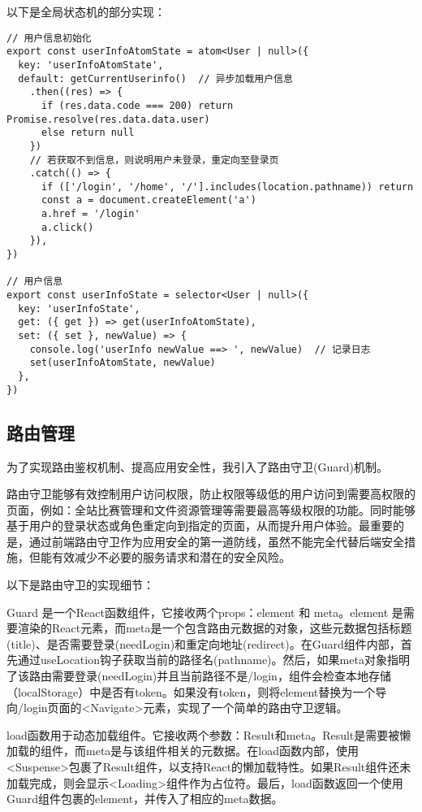 \documentclass[12pt,a4paper]{article}
\begin{document}
\begin{CJK*}{UTF8}{gbsn}
以下是全局状态机的部分实现：
\begin{mdframed}
\begin{verbatim}
// 用户信息初始化
export const userInfoAtomState = atom<User | null>({
  key: 'userInfoAtomState',
  default: getCurrentUserinfo()  // 异步加载用户信息
    .then((res) => {
      if (res.data.code === 200) return Promise.resolve(res.data.data.user)
      else return null
    })
    // 若获取不到信息，则说明用户未登录，重定向至登录页
    .catch(() => {
      if (['/login', '/home', '/'].includes(location.pathname)) return
      const a = document.createElement('a')
      a.href = '/login'
      a.click()
    }),
})

// 用户信息
export const userInfoState = selector<User | null>({
  key: 'userInfoState',
  get: ({ get }) => get(userInfoAtomState),
  set: ({ set }, newValue) => {
    console.log('userInfo newValue ==> ', newValue)  // 记录日志
    set(userInfoAtomState, newValue)
  },
})
\end{verbatim}
\end{mdframed}

\subsection{路由管理}
为了实现路由鉴权机制、提高应用安全性，我引入了路由守卫(Guard)机制。

路由守卫能够有效控制用户访问权限，防止权限等级低的用户访问到需要高权限的页面，例如：全站比赛管理和文件资源管理等需要最高等级权限的功能。同时能够基于用户的登录状态或角色重定向到指定的页面，从而提升用户体验。最重要的是，通过前端路由守卫作为应用安全的第一道防线，虽然不能完全代替后端安全措施，但能有效减少不必要的服务请求和潜在的安全风险。

以下是路由守卫的实现细节：

Guard 是一个React函数组件，它接收两个props：element 和 meta。element 是需要渲染的React元素，而meta是一个包含路由元数据的对象，这些元数据包括标题(title)、是否需要登录(needLogin)和重定向地址(redirect)。在Guard组件内部，首先通过useLocation钩子获取当前的路径名(pathname)。然后，如果meta对象指明了该路由需要登录(needLogin)并且当前路径不是/login，组件会检查本地存储（localStorage）中是否有token。如果没有token，则将element替换为一个导向/login页面的<Navigate>元素，实现了一个简单的路由守卫逻辑。

load函数用于动态加载组件。它接收两个参数：Result和meta。Result是需要被懒加载的组件，而meta是与该组件相关的元数据。在load函数内部，使用<Suspense>包裹了Result组件，以支持React的懒加载特性。如果Result组件还未加载完成，则会显示<Loading>组件作为占位符。最后，load函数返回一个使用Guard组件包裹的element，并传入了相应的meta数据。


\end{CJK*}
\end{document}
